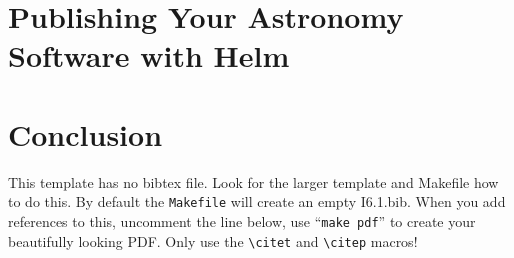 \documentclass[11pt,twoside]{article}
\begin{document}
\section{Publishing Your Astronomy Software with Helm}

\section{Conclusion}

This template has no bibtex file.  Look for the larger template and
Makefile how to do this. By default the {\tt Makefile} will create an
empty I6.1.bib. When you add references to this, uncomment the
line \verb++ below, use ``{\tt make pdf}'' to create
your beautifully looking PDF. Only use the
\verb"\citet" and \verb"\citep" macros!





\end{document}
